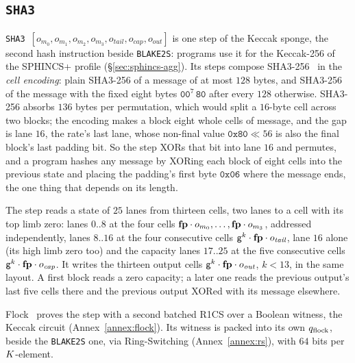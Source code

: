 \subsection{\texttt{SHA3}}\label{sec:tab-sha3}

\texttt{SHA3}\ $[o_{m_0},o_{m_1},o_{m_2},o_{m_3},o_{\mathit{tail}},o_{\mathit{cap}},o_{\mathit{out}}]$ is one step of the Keccak sponge, the second hash instruction beside \texttt{BLAKE2S}: programs use it for the Keccak-256 of the SPHINCS+ profile (\S\ref{sec:sphincs-agg}). Its steps compose SHA3-256~\cite{fips202} in the \emph{cell encoding}: plain SHA3-256 of a message of at most $128$ bytes, and SHA3-256 of the message with the fixed eight bytes $\mathtt{00}^{7}\,\mathtt{80}$ after every $128$ otherwise. SHA3-256 absorbs $136$ bytes per permutation, which would split a $16$-byte cell across two blocks; the encoding makes a block eight whole cells of message, and the gap is lane $16$, the rate's last lane, whose non-final value $\mathtt{0x80}\ll 56$ is also the final block's last padding bit. So the step XORs that bit into lane $16$ and permutes, and a program hashes any message by XORing each block of eight cells into the previous state and placing the padding's first byte $\mathtt{0x06}$ where the message ends, the one thing that depends on its length.

The step reads a state of $25$ lanes from thirteen cells, two lanes to a cell with its top limb zero: lanes $0..8$ at the four cells $\mathbf{fp}\cdot o_{m_0},\dots,\mathbf{fp}\cdot o_{m_3}$, addressed independently, lanes $8..16$ at the four consecutive cells $\mathsf{g}^{k}\cdot\mathbf{fp}\cdot o_{\mathit{tail}}$, lane $16$ alone (its high limb zero too) and the capacity lanes $17..25$ at the five consecutive cells $\mathsf{g}^{k}\cdot\mathbf{fp}\cdot o_{\mathit{cap}}$. It writes the thirteen output cells $\mathsf{g}^{k}\cdot\mathbf{fp}\cdot o_{\mathit{out}}$, $k<13$, in the same layout. A first block reads a zero capacity; a later one reads the previous output's last five cells there and the previous output XORed with its message elsewhere.

Flock~\cite{Flock26} proves the step with a second batched R1CS over a Boolean witness, the Keccak circuit (Annex~\ref{annex:flock}). Its witness is packed into its own $q_{\mathrm{flock}}$, beside the \texttt{BLAKE2S} one, via Ring-Switching (Annex~\ref{annex:rs}), with $64$ bits per $K$-element.

